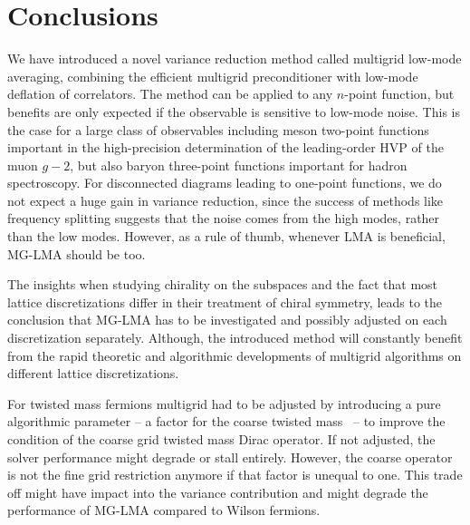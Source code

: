 \chapter{Conclusions}
\label{ch:p2:conclusions}


We have introduced a novel variance reduction method called multigrid low-mode averaging, combining the efficient multigrid preconditioner with low-mode deflation of correlators.
The method can be applied to any $n$-point function, but benefits are only expected if the observable is sensitive to low-mode noise.
This is the case for a large class of observables including meson two-point functions important in the high-precision determination of the leading-order HVP of the muon $g-2$, but also baryon three-point functions important for hadron spectroscopy.
For disconnected diagrams leading to one-point functions, we do not expect a huge gain in variance reduction, since the success of methods like frequency splitting suggests that the noise comes from the high modes, rather than the low modes.
However, as a rule of thumb, whenever LMA is beneficial, MG-LMA should be too.

The insights when studying chirality on the subspaces and the fact that most lattice discretizations differ in their treatment of chiral symmetry, leads to the conclusion that MG-LMA has to be investigated and possibly adjusted on each discretization separately.
Although, the introduced method will constantly benefit from the rapid theoretic and algorithmic developments of multigrid algorithms on different lattice discretizations.

For twisted mass fermions multigrid had to be adjusted by introducing a pure algorithmic parameter -- a factor for the coarse twisted mass~\cite{Alexandrou:2016izb} -- to improve the condition of the coarse grid twisted mass Dirac operator.
If not adjusted, the solver performance might degrade or stall entirely.
However, the coarse operator is not the fine grid restriction anymore if that factor is unequal to one.
This trade off might have impact into the variance contribution and might degrade the performance of MG-LMA compared to Wilson fermions.

